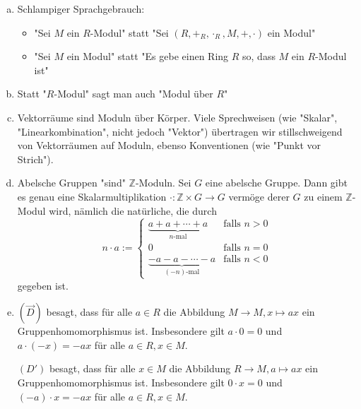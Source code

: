 \documentclass{book}
\newcommand{\Z}{\mathbb{Z}}
\begin{document}
	\begin{enumerate}[(a)]
		\item Schlampiger Sprachgebrauch: 
		\begin{itemize}
			\item "Sei $M$ ein $R$-Modul" statt "Sei $(R, +_R, \cdot_R, M, +, \cdot)$ ein Modul"
			
			\item "Sei $M$ ein Modul" statt "Es gebe einen Ring $R$ so, dass $M$ ein $R$-Modul ist"
		\end{itemize}
		
		\item Statt "$R$-Modul" sagt man auch "Modul \"uber $R$"	
		
		\item Vektorr\"aume sind Moduln \"uber K\"orper. Viele Sprechweisen (wie "Skalar", "Linearkombination", nicht jedoch "Vektor") \"ubertragen wir stillschweigend von Vektorr\"aumen auf Moduln, ebenso 
		Konventionen (wie "Punkt vor Strich").
		
		\item Abelsche Gruppen "sind" $\Z$-Moduln. Sei $G$ eine abelsche Gruppe. Dann gibt es genau eine Skalarmultiplikation $\cdot:\Z\times G \to G$ verm\"oge derer $G$ zu einem $\Z$-Modul wird, n\"amlich die nat\"urliche, die durch 
			\[n \cdot a := \begin{cases}
				\underbrace{a + a + \cdots + a}_{n\textrm{-mal}} & \textrm{falls } n > 0\\
				0 & \textrm{falls } n = 0\\
				\underbrace{-a - a - \cdots - a}_{(-n)\textrm{-mal}} & \textrm{falls } n < 0
			\end{cases}\]
		gegeben ist.
		
		\item $(\overset{\rightarrow}{D})$ besagt, dass f\"ur alle $a \in R$ die Abbildung $M \to M, x \mapsto ax$ ein Gruppenhomomorphismus ist. Insbesondere gilt $a \cdot 0 = 0$ und $a \cdot (-x) = -ax$ f\"ur alle $a \in R, x \in M$.
		
		$(D')$ besagt, dass f\"ur alle $x \in M$ die Abbildung $R \to M, a \mapsto ax$ ein Gruppenhomomorphismus ist. Insbesondere gilt $0 \cdot x = 0$ und $(-a) \cdot x = -ax$ f\"ur alle $a \in R, x \in M$.
	\end{enumerate}
\end{document}
